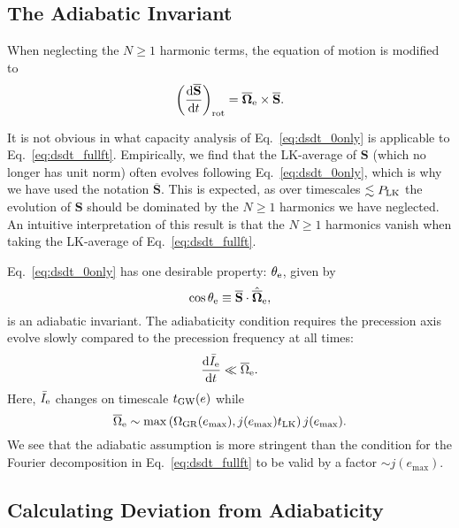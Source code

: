\documentclass[
        twocolumn,
        twocolappendix
    ]{aastex63}
\newcommand*{\rd}[2]{\frac{\mathrm{d}#1}{\mathrm{d}#2}}
\renewcommand*{\bm}[1]{\boldsymbol{\mathbf{#1}}}
\newcommand*{\uv}[1]{\hat{\bm{#1}}}
\newcommand*{\p}[1]{\left(#1\right)}
\begin{document}
\subsection{The Adiabatic Invariant}

When neglecting the $N \geq 1$ harmonic terms, the equation of motion is
modified to
\begin{equation}
    \p{\rd{\overline{\bm{S}}}{t}}_{\rm rot}
        = \bm{\overline{\Omega}}_{\rm e}
            \times \overline{\bm{S}}.\label{eq:dsdt_0only}
\end{equation}

It is not obvious in what capacity analysis of Eq.~\eqref{eq:dsdt_0only} is
applicable to Eq.~\eqref{eq:dsdt_fullft}. Empirically, we find that the
LK-average of $\bm{S}$ (which no longer has unit norm) often evolves following
Eq.~\eqref{eq:dsdt_0only}, which is why we have used the notation
$\overline{\bm{S}}$. This is expected, as over timescales $\lesssim P_{\rm LK}$
the evolution of $\bm{S}$ should be dominated by the $N \geq 1$ harmonics we
have neglected. An intuitive interpretation of this result is that the $N \geq
1$ harmonics vanish when taking the LK-average of Eq.~\eqref{eq:dsdt_fullft}.

Eq.~\eqref{eq:dsdt_0only} has one desirable property: $\theta_{\rm e}$, given by
\begin{equation}
    \cos \theta_{\rm e} \equiv
        \overline{\bm{S}} \cdot \uv{\overline{\Omega}}_{\rm e},
        \label{eq:q_eff}
\end{equation}
is an adiabatic invariant. The adiabaticity condition requires the precession
axis evolve slowly compared to the precession frequency at all times:
\begin{equation}
    \rd{\bar{I}_{\rm e}}{t} \ll \overline{\Omega}_{\rm e}.\label{eq:ad_constr}
\end{equation}
Here, $\bar{I}_{\rm e}$ changes on timescale $t_{\rm GW}(e)$ while
\begin{equation}
    \overline{\Omega}_{\rm e} \sim \max\p{\Omega_{\rm GR}(e_{\max}),
        j(e_{\max})t_{\rm LK}}j(e_{\max}).
\end{equation}
We see that the adiabatic assumption is more stringent than the condition for
the Fourier decomposition in Eq.~\eqref{eq:dsdt_fullft} to be valid by a factor
$\sim j(e_{\max})$.

\subsection{Calculating Deviation from Adiabaticity}\label{ss:eom_0}
\end{document}
